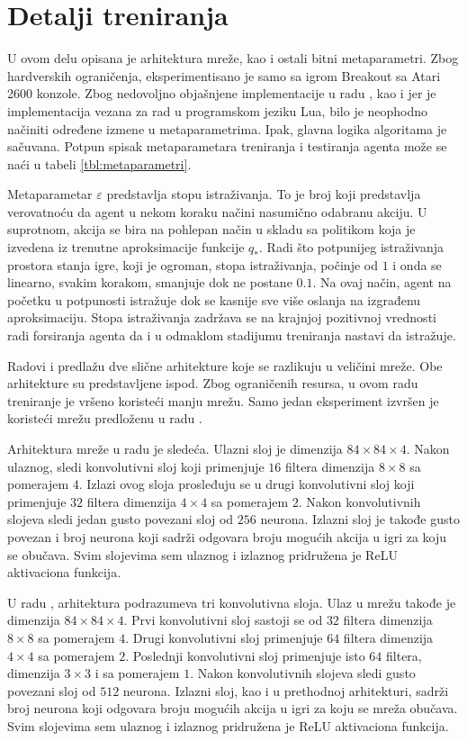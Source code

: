 \section{Detalji treniranja}
\label{sec:treniranje}
U ovom delu opisana je arhitektura mreže, kao i ostali bitni metaparametri. Zbog hardverskih ograničenja, eksperimentisano je samo sa igrom Breakout sa Atari 2600 konzole. Zbog nedovoljno objašnjene implementacije u radu \cite{dqn_mnih}, kao i jer je implementacija vezana za rad \cite{dqn_dm} u programskom jeziku Lua, bilo je neophodno načiniti određene izmene u metaparametrima. Ipak, glavna logika algoritama je sačuvana. Potpun spisak metaparametara treniranja i testiranja agenta može se naći u tabeli \ref{tbl:metaparametri}.
\par 
Metaparametar $\varepsilon$ predstavlja stopu istraživanja. To je broj koji predstavlja verovatnoću da agent u nekom koraku načini nasumično odabranu akciju. U suprotnom, akcija se bira na pohlepan način u skladu sa politikom koja je izvedena iz trenutne aproksimacije funkcije $q_*$. Radi što potpunijeg istraživanja prostora stanja igre, koji je ogroman, stopa istraživanja, počinje od $1$ i onda se linearno, svakim korakom, smanjuje dok ne postane $0.1$. Na ovaj način, agent na početku u potpunosti istražuje dok se kasnije sve više oslanja na izgrađenu aproksimaciju. Stopa istraživanja zadržava se na krajnjoj pozitivnoj vrednosti radi forsiranja agenta da i u odmaklom stadijumu treniranja nastavi da istražuje.
\par 
Radovi  \cite{dqn_mnih} i \cite{dqn_dm} predlažu dve slične arhitekture koje se razlikuju u veličini mreže. Obe arhitekture su predstavljene ispod. Zbog ograničenih resursa, u ovom radu treniranje je vršeno koristeći manju mrežu. Samo jedan eksperiment izvršen je koristeći mrežu predloženu u radu \cite{dqn_dm}.
\par 
Arhitektura mreže u radu \cite{dqn_mnih} je sledeća. Ulazni sloj je dimenzija $84 \times 84 \times 4$. Nakon ulaznog, sledi konvolutivni sloj koji primenjuje $16$ filtera dimenzija $8 \times 8$ sa pomerajem $4$. Izlazi ovog sloja prosleđuju se u drugi konvolutivni sloj koji primenjuje $32$ filtera dimenzija $4 \times 4$ sa pomerajem $2$. Nakon konvolutivnih slojeva sledi jedan gusto povezani sloj od $256$ neurona. Izlazni sloj je takođe gusto povezan i broj neurona koji sadrži odgovara broju mogućih akcija u igri za koju se obučava. Svim slojevima sem ulaznog i izlaznog pridružena je ReLU aktivaciona funkcija.
\par 
U radu \cite{dqn_dm}, arhitektura podrazumeva tri konvolutivna sloja. Ulaz u mrežu takođe je dimenzija $84 \times 84 \times 4$. Prvi konvolutivni sloj sastoji se od $32$ filtera dimenzija $8 \times 8$ sa pomerajem $4$. Drugi konvolutivni sloj primenjuje $64$ filtera dimenzija $4 \times 4$ sa pomerajem $2$. Poslednji konvolutivni sloj primenjuje isto $64$ filtera, dimenzija $3 \times 3$ i sa pomerajem $1$. Nakon konvolutivnih slojeva sledi gusto povezani sloj od $512$ neurona. Izlazni sloj, kao i u prethodnoj arhitekturi, sadrži broj neurona koji odgovara broju mogućih akcija u igri za koju se mreža obučava. Svim slojevima sem ulaznog i izlaznog pridružena je ReLU aktivaciona funkcija.

